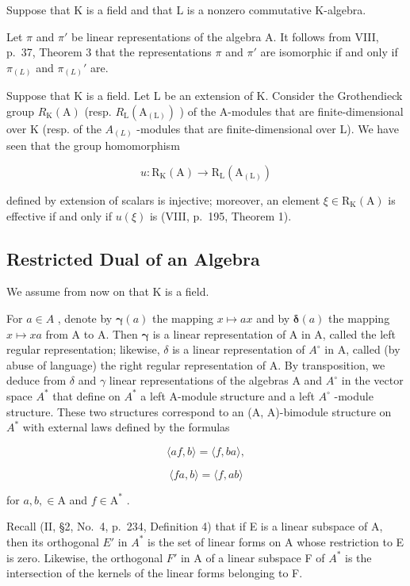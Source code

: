 Suppose that K is a field and that L is a nonzero commutative K-algebra.

Let \(\pi\) and \(\pi'\) be linear representations of the algebra A. It follows from VIII, p.~37, Theorem 3 that the representations \(\pi\) and \(\pi'\) are isomorphic if and only if \(\pi_{(L)}\) and \(\pi_{(L)}'\) are.

Suppose that K is a field. Let L be an extension of K. Consider the Grothendieck group \(R_{\mathrm{K}}(\mathrm{A})\) (resp. \(R_{\mathrm{L}}(\mathrm{A}_{(\mathrm{L})})\) ) of the A-modules that are finite-dimensional over K (resp. of the \(A_{(L)}\) -modules that are finite-dimensional over L). We have seen that the group homomorphism

\[
u: \mathrm{R} _ {\mathrm{K}} (\mathrm{A}) \longrightarrow \mathrm{R} _ {\mathrm{L}} (\mathrm{A} _ {(\mathrm{L})})
\]

defined by extension of scalars is injective; moreover, an element \(\xi \in \mathrm{R}_{\mathrm{K}}(\mathrm{A})\) is effective if and only if \(u(\xi)\) is (VIII, p.~195, Theorem 1).

\subsection{Restricted Dual of an Algebra}

We assume from now on that K is a field.

For \(a \in A\) , denote by \(\boldsymbol{\gamma}(a)\) the mapping \(x \mapsto ax\) and by \(\boldsymbol{\delta}(a)\) the mapping \(x \mapsto xa\) from A to A. Then \(\boldsymbol{\gamma}\) is a linear representation of A in A, called the left regular representation; likewise, \(\delta\) is a linear representation of \(A^{\circ}\) in A, called (by abuse of language) the right regular representation of A. By transposition, we deduce from \(\delta\) and \(\gamma\) linear representations of the algebras A and \(A^{\circ}\) in the vector space \(A^{*}\) that define on \(A^{*}\) a left A-module structure and a left \(A^{\circ}\) -module structure. These two structures correspond to an (A, A)-bimodule structure on \(A^{*}\) with external laws defined by the formulas

\[
\langle a f, b \rangle = \langle f, b a \rangle ,\tag{3}
\]

\[
\langle f a, b \rangle = \langle f, a b \rangle\tag{4}
\]

for \(a, b, \in \mathrm{A}\) and \(f \in \mathrm{A}^*\) .

Recall (II, §2, No.~4, p.~234, Definition 4) that if E is a linear subspace of A, then its orthogonal \(E'\) in \(A^{*}\) is the set of linear forms on A whose restriction to E is zero. Likewise, the orthogonal \(F'\) in A of a linear subspace F of \(A^{*}\) is the intersection of the kernels of the linear forms belonging to F.

